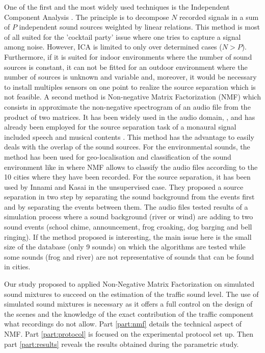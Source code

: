 \documentclass[twocolumn,a4paper,10pt]{article}
\begin{document}
One of the first and the most widely used techniques is the Independent Component Analysis \cite{comon_independent_1994}. The principle is to decompose $N$ recorded signals in a sum of $P$ independent sound sources weighted by linear relations. This method is most of all suited for the 'cocktail party' issue where one tries to capture a signal among noise.  However, ICA is limited to only over determined cases ($N > P$). Furthermore, if it is suited for indoor environments where the number of sound sources is constant, it can not be fitted for an outdoor environment where the number of sources is unknown and variable and, moreover, it would be necessary to install multiples sensors on one point to realize the source separation which is not feasible. A second method is Non-negative Matrix Factorization (NMF) \cite{lee_learning_1999} which consists in approximate the non-negative spectrogram of an audio file from the product of two matrices. It has been widely used in the audio domain, \cite{smaragdis_non-negative_2003} \cite{wilson_speech_2008} \cite{mesaros_sound_2015}, and has already been employed for the source separation task of a monaural signal included speech and musical contents  \cite{wang_musical_2005} \cite{wilson_speech_2008}. This method has the advantage to easily deals with the overlap of the sound sources. For the environmental sounds, the method has been used for geo-localisation and classification of the sound environment like in \cite{kumar_audio_2016} where NMF allows to classify the audio files according to the 10 cities where they have been recorded. For the source separation, it has been used by Innami and Kasai in the unsupervised case. They proposed a source separation in two step  by separating the sound background from the events first and by separating the events between them. The audio files tested results of a simulation process where a sound background (river or wind) are adding to two sound events (school chime, announcement, frog croaking, dog barging and bell ringing). If the method proposed is interesting, the main issue here is the small size of the database (only 9 sounds) on which the algorithms are tested while some sounds (frog and river) are not representative of sounds that can be found in cities.

Our study proposed to applied Non-Negative Matrix Factorization on simulated sound mixtures to succeed on the estimation of the traffic sound level. The use of simulated sound mixtures is necessary as it offers a full control on the design of the scenes and the knowledge of the exact contribution of the traffic component what recordings do not allow. Part \ref{part:nmf} details the technical aspect of NMF. Part \ref{part:protocol} is focused on the experimental protocol set up. Then part \ref{part:results} reveals the results obtained during the parametric study. 
\end{document}
